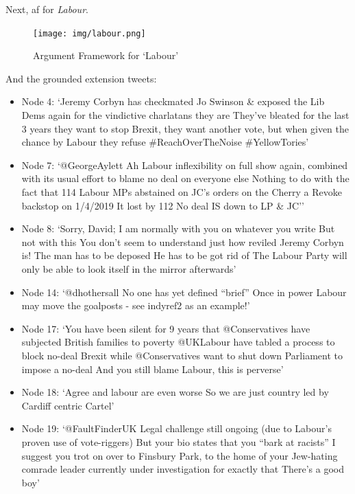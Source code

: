             Next, \gls{af} for \textit{Labour}.
            
            \begin{figure}[!htbp]
                \centering
                \texttt{[image: img/labour.png]}
                \caption{Argument Framework for `Labour'}
                \label{fig:labour}
            \end{figure}
            \FloatBarrier
            
            And the grounded extension tweets:
            \begin{itemize}
                \item Node 4: `Jeremy Corbyn has checkmated Jo Swinson \& exposed the Lib Dems again for the vindictive charlatans they are  They've bleated for the last 3 years they want to stop Brexit, they want another vote, but when given the chance by Labour they refuse \#ReachOverTheNoise \#YellowTories'
                \item Node 7: `@GeorgeAylett Ah Labour inflexibility on full show again, combined with its usual effort to blame no deal on everyone else   Nothing to do with the fact that 114 Labour MPs abstained on JC’s orders on the Cherry a Revoke backstop on 1/4/2019    It lost by 112   No deal IS down to LP \& JC''
                \item Node 8: `Sorry, David; I am normally with you on whatever you write   But not with this   You don't seem to understand just how reviled Jeremy Corbyn is!  The man has to be deposed   He has to be got rid of   The Labour Party will only be able to look itself in the mirror afterwards'
                \item Node 14: `@dhothersall No one has yet defined ``brief'' Once in power Labour may move the goalposts - see indyref2 as an example!'
                \item Node 17: `You have been silent for 9 years that @Conservatives have subjected British families to poverty  @UKLabour have tabled a process to block no-deal Brexit while @Conservatives want to shut down Parliament to impose a no-deal  And you still blame Labour, this is perverse'
                \item Node 18: `Agree  and labour are even worse  So we are just country led by Cardiff centric Cartel'
                \item Node 19: `@FaultFinderUK Legal challenge still ongoing (due to Labour's proven use of vote-riggers)  But your bio states that you ``bark at racists'' I suggest you trot on over to Finsbury Park, to the home of your Jew-hating comrade leader currently under investigation for exactly that  There's a good boy'
            \end{itemize}
            
